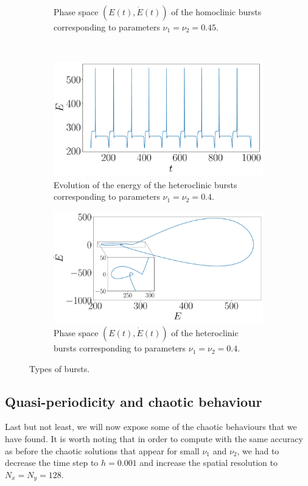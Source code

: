 \documentclass[twoside]{article}
\begin{document}
\begin{figure}[ht]
\begin{subfigure}[ht]{0.45\textwidth}
    \caption{Phase space $(E(t), \dot{E}(t))$ of the homoclinic bursts corresponding to parameters $\nu_1=\nu_2=0.45$.}
  \end{subfigure}\\
  \begin{subfigure}[ht]{0.45\textwidth}
    \includegraphics[width=\textwidth]{images/hetero_burst.pdf}
    \caption{Evolution of the energy of the heteroclinic bursts corresponding to parameters $\nu_1=\nu_2=0.4$.}
  \end{subfigure}\hfill
  \begin{subfigure}[ht]{0.45\textwidth}
    \includegraphics[width=\textwidth]{images/hetero_burst_phase.pdf}
    \caption{Phase space $(E(t), \dot{E}(t))$ of the heteroclinic bursts corresponding to parameters $\nu_1=\nu_2=0.4$.}
  \end{subfigure}
  \caption{Types of bursts.}
  \label{fig:burst}
\end{figure}

\subsection{Quasi-periodicity and chaotic behaviour}\label{sec:chaotic}
Last but not least, we will now expose some of the chaotic behaviours that we have found. It is worth noting that in order to compute with the same accuracy as before the chaotic solutions that appear for small $\nu_1$ and $\nu_2$, we had to decrease the time step to $h=0.001$ and increase the spatial resolution to $N_x=N_y=128$.
\end{document}
